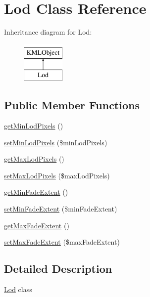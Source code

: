 \hypertarget{classLod}{
\section{Lod Class Reference}
\label{d9/de2/classLod}
}
Inheritance diagram for Lod:\begin{figure}[H]
\begin{center}
\leavevmode
\includegraphics[height=2.000000cm]{d9/de2/classLod}
\end{center}
\end{figure}
\subsection*{Public Member Functions}
\begin{DoxyCompactItemize}
\item 
\hyperlink{classLod_a517c154c3cfc2eaa02f97477ba36a81f}{getMinLodPixels} ()
\item 
\hyperlink{classLod_afc28b5df968875bce77edec641d854ed}{setMinLodPixels} (\$minLodPixels)
\item 
\hyperlink{classLod_a39470fc6cc9cd7e2faf928fc5d616d20}{getMaxLodPixels} ()
\item 
\hyperlink{classLod_aad2fcdccd4686b65e4246bdd7bddd76e}{setMaxLodPixels} (\$maxLodPixels)
\item 
\hyperlink{classLod_a9b530e9277c3e6df1eed35c756c95a98}{getMinFadeExtent} ()
\item 
\hyperlink{classLod_a4c98962dd7477d68f479e882efe2f758}{setMinFadeExtent} (\$minFadeExtent)
\item 
\hyperlink{classLod_a0b40656804251ba35ae706b84667d71d}{getMaxFadeExtent} ()
\item 
\hyperlink{classLod_a90952726bb097dd91bef75765c1f60f9}{setMaxFadeExtent} (\$maxFadeExtent)
\end{DoxyCompactItemize}


\subsection{Detailed Description}
\hyperlink{classLod}{Lod} class 

